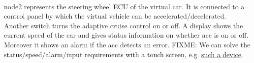 \paragraph{}
node2 represents the steering wheel ECU of the virtual car. It is connected to a control panel by which the virtual 
vehicle can be accelerated/decelerated. Another switch turns the adaptive cruise control on or off.
A display shows the current speed of the car and gives status information on whether acc is on or off.
Moreover it shows an alarm if the acc detects an error.
FIXME: We can solve the status/speed/alarm/input requirements with a touch screen, e.g. 
\href{https://www.berrybase.de/3-5-ips-display-fuer-raspberry-pi-mit-resistivem-touchscreen} {such a device}.
